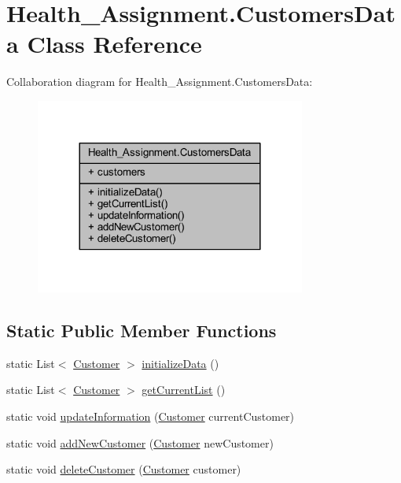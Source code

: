 \hypertarget{class_health___assignment_1_1_customers_data}{}\section{Health\+\_\+\+Assignment.\+Customers\+Data Class Reference}
\label{class_health___assignment_1_1_customers_data}


Collaboration diagram for Health\+\_\+\+Assignment.\+Customers\+Data\+:\nopagebreak
\begin{figure}[H]
\begin{center}
\leavevmode
\includegraphics[width=252pt]{class_health___assignment_1_1_customers_data__coll__graph}
\end{center}
\end{figure}
\subsection*{Static Public Member Functions}
\begin{DoxyCompactItemize}
\item 
static List$<$ \hyperlink{class_health___assignment_1_1_customer}{Customer} $>$ \hyperlink{class_health___assignment_1_1_customers_data_a19424ede969d2f858034de85ef2ba264}{initialize\+Data} ()
\item 
static List$<$ \hyperlink{class_health___assignment_1_1_customer}{Customer} $>$ \hyperlink{class_health___assignment_1_1_customers_data_a3e48c151490121db0bf830ffd7406cb6}{get\+Current\+List} ()
\item 
static void \hyperlink{class_health___assignment_1_1_customers_data_a5851fe910f7891ade7f707768b6e79eb}{update\+Information} (\hyperlink{class_health___assignment_1_1_customer}{Customer} current\+Customer)
\item 
static void \hyperlink{class_health___assignment_1_1_customers_data_a62df79057aead98766588126b4c36602}{add\+New\+Customer} (\hyperlink{class_health___assignment_1_1_customer}{Customer} new\+Customer)
\item 
static void \hyperlink{class_health___assignment_1_1_customers_data_afff7bee8ea355d57a6e694e5d10b9f90}{delete\+Customer} (\hyperlink{class_health___assignment_1_1_customer}{Customer} customer)
\end{DoxyCompactItemize}
